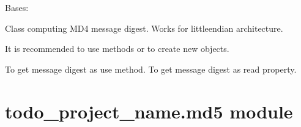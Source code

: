 \documentclass[letterpaper,10pt,english]{sphinxmanual}
\begin{document}
\begin{fulllineitems}
\label{\detokenize{todo_project_name:todo_project_name.md4.MD4}}
\pysigstartsignatures
{}
\pysigstopsignatures
\sphinxAtStartPar
Bases: {\hyperref[\detokenize{todo_project_name:todo_project_name.mdn.MDN}]{}}

\sphinxAtStartPar
Class computing MD4 message digest. Works for little\sphinxhyphen{}endian architecture.

\sphinxAtStartPar
It is recommended to use methods  or 
to create new objects.

\sphinxAtStartPar
To get message digest as  use  method.
To get message digest as  read  property.

\begin{fulllineitems}
\label{\detokenize{todo_project_name:todo_project_name.md4.MD4.ROUND_2}}
\pysigstartsignatures
{}
\pysigstopsignatures
\end{fulllineitems}


\begin{fulllineitems}
\label{\detokenize{todo_project_name:todo_project_name.md4.MD4.ROUND_3}}
\pysigstartsignatures
{}
\pysigstopsignatures
\end{fulllineitems}


\end{fulllineitems}



\section{todo\_project\_name.md5 module}
\label{\detokenize{todo_project_name:module-todo_project_name.md5}}\label{\detokenize{todo_project_name:todo-project-name-md5-module}}
\end{document}
